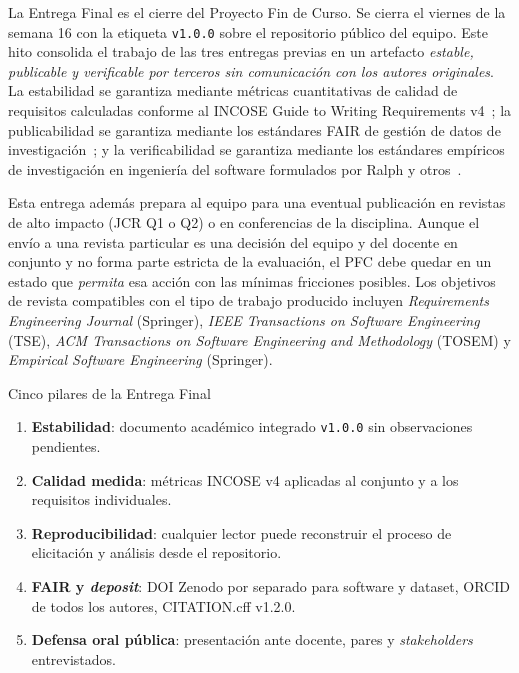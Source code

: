 \documentclass[11pt,a4paper]{article}
\begin{document}
La Entrega Final es el cierre del Proyecto Fin de Curso. Se cierra el viernes de la semana 16 con la etiqueta \texttt{v1.0.0} sobre el repositorio p\'ublico del equipo. Este hito consolida el trabajo de las tres entregas previas en un artefacto \emph{estable, publicable y verificable por terceros sin comunicaci\'on con los autores originales}. La estabilidad se garantiza mediante m\'etricas cuantitativas de calidad de requisitos calculadas conforme al INCOSE Guide to Writing Requirements v4~\cite{incose2023requirements}; la publicabilidad se garantiza mediante los est\'andares FAIR de gesti\'on de datos de investigaci\'on~\cite{wilkinson2016fair}; y la verificabilidad se garantiza mediante los est\'andares emp\'iricos de investigaci\'on en ingenier\'ia del software formulados por Ralph y otros~\cite{ralph2021empirical}.

Esta entrega adem\'as prepara al equipo para una eventual publicaci\'on en revistas de alto impacto (JCR Q1 o Q2) o en conferencias de la disciplina. Aunque el env\'io a una revista particular es una decisi\'on del equipo y del docente en conjunto y no forma parte estricta de la evaluaci\'on, el PFC debe quedar en un estado que \emph{permita} esa acci\'on con las m\'inimas fricciones posibles. Los objetivos de revista compatibles con el tipo de trabajo producido incluyen \emph{Requirements Engineering Journal} (Springer), \emph{IEEE Transactions on Software Engineering} (TSE), \emph{ACM Transactions on Software Engineering and Methodology} (TOSEM) y \emph{Empirical Software Engineering} (Springer).

\begin{cajadefinicion}{Cinco pilares de la Entrega Final}
\begin{enumerate}
    \item \textbf{Estabilidad}: documento acad\'emico integrado \texttt{v1.0.0} sin observaciones pendientes.
    \item \textbf{Calidad medida}: m\'etricas INCOSE v4 aplicadas al conjunto y a los requisitos individuales.
    \item \textbf{Reproducibilidad}: cualquier lector puede reconstruir el proceso de elicitaci\'on y an\'alisis desde el repositorio.
    \item \textbf{FAIR y \emph{deposit}}: DOI Zenodo por separado para software y dataset, ORCID de todos los autores, CITATION.cff v1.2.0.
    \item \textbf{Defensa oral p\'ublica}: presentaci\'on ante docente, pares y \emph{stakeholders} entrevistados.
\end{enumerate}
\end{cajadefinicion}
\end{document}
